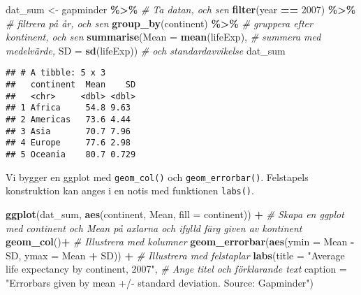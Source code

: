 \documentclass[
]{book}
\newenvironment{Shaded}{\begin{snugshade}}{\end{snugshade}}
\newcommand{\AttributeTok}[1]{\textcolor[rgb]{0.13,0.29,0.53}{#1}}
\newcommand{\CommentTok}[1]{\textcolor[rgb]{0.56,0.35,0.01}{\textit{#1}}}
\newcommand{\DecValTok}[1]{\textcolor[rgb]{0.00,0.00,0.81}{#1}}
\newcommand{\FunctionTok}[1]{\textcolor[rgb]{0.13,0.29,0.53}{\textbf{#1}}}
\newcommand{\NormalTok}[1]{#1}
\newcommand{\OtherTok}[1]{\textcolor[rgb]{0.56,0.35,0.01}{#1}}
\newcommand{\SpecialCharTok}[1]{\textcolor[rgb]{0.81,0.36,0.00}{\textbf{#1}}}
\newcommand{\StringTok}[1]{\textcolor[rgb]{0.31,0.60,0.02}{#1}}
\theoremstyle{definition}
\theoremstyle{definition}
\theoremstyle{definition}
\theoremstyle{definition}
\theoremstyle{remark}
\begin{document}
\begin{Shaded}
\begin{Highlighting}[]
\NormalTok{dat\_sum }\OtherTok{\textless{}{-}}\NormalTok{ gapminder }\SpecialCharTok{\%\textgreater{}\%}                         \CommentTok{\# Ta datan, och sen}
  \FunctionTok{filter}\NormalTok{(year }\SpecialCharTok{==} \DecValTok{2007}\NormalTok{) }\SpecialCharTok{\%\textgreater{}\%}                       \CommentTok{\# filtrera på år, och sen}
  \FunctionTok{group\_by}\NormalTok{(continent) }\SpecialCharTok{\%\textgreater{}\%}                        \CommentTok{\# gruppera efter kontinent, och sen}
  \FunctionTok{summarise}\NormalTok{(}\AttributeTok{Mean =} \FunctionTok{mean}\NormalTok{(lifeExp),                }\CommentTok{\# summera med medelvärde,}
            \AttributeTok{SD =} \FunctionTok{sd}\NormalTok{(lifeExp))                    }\CommentTok{\# och standardavvikelse}
\NormalTok{dat\_sum}
\end{Highlighting}
\end{Shaded}

\begin{verbatim}
## # A tibble: 5 x 3
##   continent  Mean    SD
##   <chr>     <dbl> <dbl>
## 1 Africa     54.8 9.63 
## 2 Americas   73.6 4.44 
## 3 Asia       70.7 7.96 
## 4 Europe     77.6 2.98 
## 5 Oceania    80.7 0.729
\end{verbatim}

Vi bygger en ggplot med \texttt{geom\_col()} och \texttt{geom\_errorbar()}. Felstapels konstruktion kan anges i en notis med funktionen \texttt{labs()}.

\begin{Shaded}
\begin{Highlighting}[]
\FunctionTok{ggplot}\NormalTok{(dat\_sum, }\FunctionTok{aes}\NormalTok{(continent, Mean, }\AttributeTok{fill =}\NormalTok{ continent)) }\SpecialCharTok{+}          \CommentTok{\# Skapa en ggplot med continent och Mean på axlarna och ifylld färg given av kontinent}
  \FunctionTok{geom\_col}\NormalTok{()}\SpecialCharTok{+}                                                      \CommentTok{\# Illustrera med kolumner}
  \FunctionTok{geom\_errorbar}\NormalTok{(}\FunctionTok{aes}\NormalTok{(}\AttributeTok{ymin =}\NormalTok{ Mean }\SpecialCharTok{{-}}\NormalTok{ SD, }\AttributeTok{ymax =}\NormalTok{ Mean }\SpecialCharTok{+}\NormalTok{ SD)) }\SpecialCharTok{+}         \CommentTok{\# Illustrera med felstaplar}
  \FunctionTok{labs}\NormalTok{(}\AttributeTok{title =} \StringTok{"Average life expectancy by continent, 2007"}\NormalTok{,       }\CommentTok{\# Ange titel och förklarande text}
       \AttributeTok{caption =} \StringTok{"Errorbars given by mean +/{-} standard deviation.}
\StringTok{       Source: Gapminder"}\NormalTok{)}
\end{Highlighting}
\end{Shaded}
\end{document}
